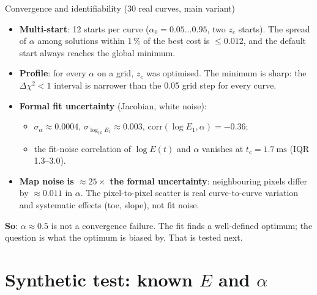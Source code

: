 \documentclass[aspectratio=169,9pt]{beamer}
\begin{document}
\begin{frame}{Convergence and identifiability (30 real curves, main variant)}
\small
\begin{itemize}
\item \textbf{Multi-start}: 12 starts per curve ($\alpha_0=0.05\dots0.95$, two $z_c$ starts). The spread of $\alpha$ among solutions within 1\,\% of the best cost is $\le0.012$, and the default start always reaches the global minimum.
\item \textbf{Profile}: for every $\alpha$ on a grid, $z_c$ was optimised. The minimum is sharp: the $\Delta\chi^2<1$ interval is narrower than the 0.05 grid step for every curve.
\item \textbf{Formal fit uncertainty} (Jacobian, white noise):
 \begin{itemize}
 \item $\sigma_\alpha\approx0.0004$, $\sigma_{\log_{10}E_1}\approx0.003$, $\mathrm{corr}(\log E_1,\alpha)=-0.36$;
 \item the fit-noise correlation of $\log E(t)$ and $\alpha$ vanishes at $t_c=\SI{1.7}{\milli\second}$ (IQR 1.3--3.0).
 \end{itemize}
\item \textbf{Map noise is $\approx25\times$ the formal uncertainty}: neighbouring pixels differ by $\approx0.011$ in $\alpha$. The pixel-to-pixel scatter is real curve-to-curve variation and systematic effects (toe, slope), not fit noise.
\end{itemize}
\vspace{4pt}
\textbf{So}: $\alpha\approx0.5$ is not a convergence failure. The fit finds a well-defined optimum; the question is what the optimum is biased by. That is tested next.
\end{frame}

\section{Synthetic test: known $E$ and $\alpha$}
\end{document}
